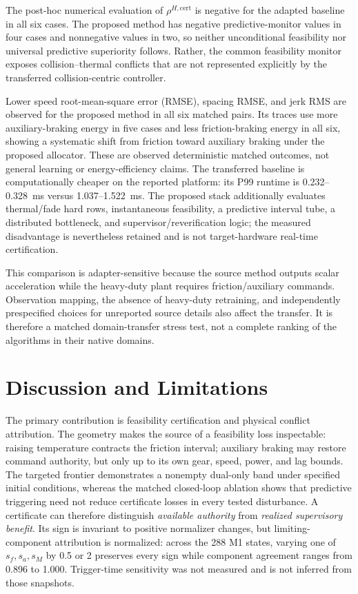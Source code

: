 The post-hoc numerical evaluation of $\rho^{H,\mathrm{cert}}$ is negative for the adapted baseline in all six cases. The proposed method has negative predictive-monitor values in four cases and nonnegative values in two, so neither unconditional feasibility nor universal predictive superiority follows. Rather, the common feasibility monitor exposes collision--thermal conflicts that are not represented explicitly by the transferred collision-centric controller.

Lower speed root-mean-square error (RMSE), spacing RMSE, and jerk RMS are observed for the proposed method in all six matched pairs. Its traces use more auxiliary-braking energy in five cases and less friction-braking energy in all six, showing a systematic shift from friction toward auxiliary braking under the proposed allocator. These are observed deterministic matched outcomes, not general learning or energy-efficiency claims. The transferred baseline is computationally cheaper on the reported platform: its P99 runtime is 0.232--0.328~ms versus 1.037--1.522~ms. The proposed stack additionally evaluates thermal/fade hard rows, instantaneous feasibility, a predictive interval tube, a distributed bottleneck, and supervisor/reverification logic; the measured disadvantage is nevertheless retained and is not target-hardware real-time certification.

This comparison is adapter-sensitive because the source method outputs scalar acceleration while the heavy-duty plant requires friction/auxiliary commands. Observation mapping, the absence of heavy-duty retraining, and independently prespecified choices for unreported source details also affect the transfer. It is therefore a matched domain-transfer stress test, not a complete ranking of the algorithms in their native domains.

\section{Discussion and Limitations}
The primary contribution is feasibility certification and physical conflict attribution. The geometry makes the source of a feasibility loss inspectable: raising temperature contracts the friction interval; auxiliary braking may restore command authority, but only up to its own gear, speed, power, and lag bounds. The targeted frontier demonstrates a nonempty dual-only band under specified initial conditions, whereas the matched closed-loop ablation shows that predictive triggering need not reduce certificate losses in every tested disturbance. A certificate can therefore distinguish \emph{available authority} from \emph{realized supervisory benefit}. Its sign is invariant to positive normalizer changes, but limiting-component attribution is normalized: across the 288 M1 states, varying one of $s_f,s_a,s_M$ by 0.5 or 2 preserves every sign while component agreement ranges from 0.896 to 1.000. Trigger-time sensitivity was not measured and is not inferred from those snapshots.

